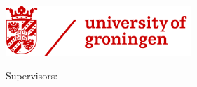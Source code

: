 \begin{titlepage}
    \begin{addmargin}[-1cm]{-3cm}
    \begin{center}
        \large

        \hfill

        \vfill
        
        \vfill

        \begingroup
            \color{Maroon}\spacedallcaps{\myTitle} \\ \bigskip
        \endgroup
		
		\vfill
		
		\spacedlowsmallcaps{\myName} \\
		\myDegree \\
		
		\vfill
		
		\includegraphics[width=7cm]{gfx/RUG_logo.png} \\
		
		\medskip
		
		Supervisors: \\
		\myProf \\
		\myOtherProf
		
		\vfill
		
        \mySubtitle \\ \medskip
        
        \myDepartment \\
        \myFaculty \\

		\medskip
		
        \myTime

        \vfill

    \end{center}
  \end{addmargin}
\end{titlepage}
